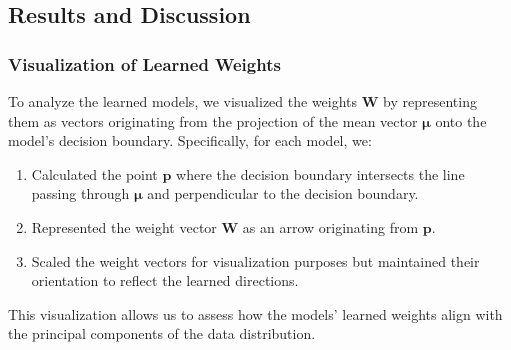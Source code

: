 \subsection{Results and Discussion}

\subsubsection{Visualization of Learned Weights}

To analyze the learned models, we visualized the weights $\mathbf{W}$ by representing them as vectors originating from the projection of the mean vector $\boldsymbol{\mu}$ onto the model's decision boundary. Specifically, for each model, we:

\begin{enumerate} \item Calculated the point $\mathbf{p}$ where the decision boundary intersects the line passing through $\boldsymbol{\mu}$ and perpendicular to the decision boundary.
    \item Represented the weight vector $\mathbf{W}$ as an arrow originating from $\mathbf{p}$.

    \item Scaled the weight vectors for visualization purposes but maintained their orientation to reflect the learned directions.
    
\end{enumerate}

This visualization allows us to assess how the models' learned weights align with the principal components of the data distribution.


